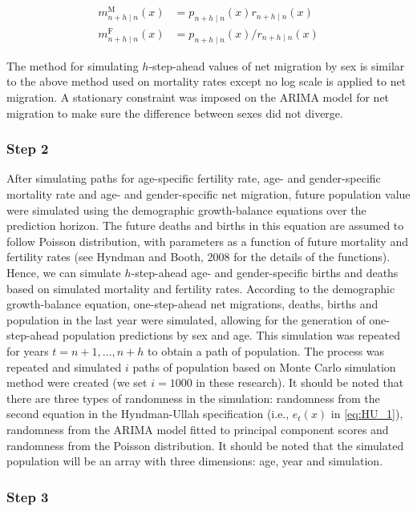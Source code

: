 \documentclass[11pt,a4paper,]{article}
\begin{document}
\begin{align*}
  m_{n+h\mid n}^{\text{M}}(x) & = p_{n+h\mid n}(x)r_{n+h\mid n}(x)\\
  m_{n+h\mid n}^{\text{F}}(x) & = p_{n+h\mid n}(x)/r_{n+h\mid n}(x)
\end{align*}

The method for simulating \(h\)-step-ahead values of net migration by
sex is similar to the above method used on mortality rates except no log
scale is applied to net migration. A stationary constraint was imposed
on the ARIMA model for net migration to make sure the difference between
sexes did not diverge.

\subsubsection*{Step 2}\label{step-2}

After simulating paths for age-specific fertility rate, age- and
gender-specific mortality rate and age- and gender-specific net
migration, future population value were simulated using the demographic
growth-balance equations over the prediction horizon. The future deaths
and births in this equation are assumed to follow Poisson distribution,
with parameters as a function of future mortality and fertility rates
(see Hyndman and Booth, 2008 for the details of the functions). Hence,
we can simulate \(h\)-step-ahead age- and gender-specific births and
deaths based on simulated mortality and fertility rates. According to
the demographic growth-balance equation, one-step-ahead net migrations,
deaths, births and population in the last year were simulated, allowing
for the generation of one-step-ahead population predictions by sex and
age. This simulation was repeated for years \(t=n+1,\dots,n+h\) to
obtain a path of population. The process was repeated and simulated
\(i\) paths of population based on Monte Carlo simulation method were
created (we set \(i=1000\) in these research). It should be noted that
there are three types of randomness in the simulation: randomness from
the second equation in the Hyndman-Ullah specification (i.e., \(e_t(x)\)
in \eqref{eq:HU_1}), randomness from the ARIMA model fitted to principal
component scores and randomness from the Poisson distribution. It should
be noted that the simulated population will be an array with three
dimensions: age, year and simulation.

\subsubsection*{Step 3}\label{step-3}
\end{document}
